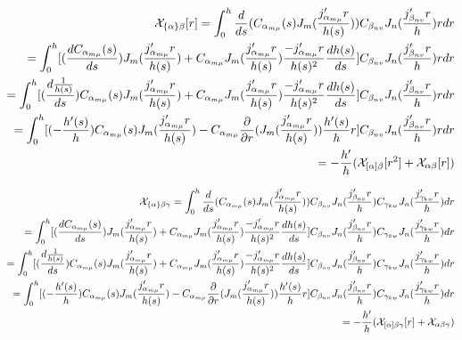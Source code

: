 \documentclass{Note}
\begin{document}
\begin{equation}
\begin{aligned}
\mathcal{X}_{\{\alpha\}\beta}[r]=\int_0^h {d\over ds}(C_{\alpha_{m\mu}}(s) J_m({j'_{\alpha_{m\mu}}r\over h(s)}))C_{\beta_{nv}} J_n({j'_{\beta_{nv}}r\over h})rdr\\
=\int_0^h [({dC_{\alpha_{m\mu}}(s)\over ds})J_m({j'_{\alpha_{m\mu}}r\over h(s)})+
C_{\alpha_{m\mu}} J_m({j'_{\alpha_{m\mu}}r\over h(s)}) {-j'_{\alpha_{m\mu}}r\over h(s)^2}{dh(s)\over ds}]C_{\beta_{nv}} J_n({j'_{\beta_{nv}}r\over h})rdr\\
=\int_0^h [({d{1\over h(s)}\over ds}){C_{\alpha_{m\mu}}(s)} J_m({j'_{\alpha_{m\mu}}r\over h(s)})+
C_{\alpha_{m\mu}} J_m({j'_{\alpha_{m\mu}}r\over h(s)}) {-j'_{\alpha_{m\mu}}r\over h(s)^2}{dh(s)\over ds}]C_{\beta_{nv}} J_n({j'_{\beta_{nv}}r\over h})rdr\\
=\int_0^h [(-{h'(s)\over h}){C_{\alpha_{m\mu}}(s) } J_m({j'_{\alpha_{m\mu}}r\over h(s)})-
C_{\alpha_{m\mu}} {\partial \over \partial r}(J_m({j'_{\alpha_{m\mu}}r\over h(s)})) {h'(s)\over h}r]C_{\beta_{nv}} J_n({j'_{\beta_{nv}}r\over h})rdr\\
=-{h'\over h}(\mathcal{X}_{[\alpha]\beta}[r^2]+\mathcal{X}_{\alpha\beta}[r])
\end{aligned}
\end{equation}


\begin{equation}
\begin{aligned}
\mathcal{X}_{\{\alpha\}\beta\gamma}=\int_0^h {d\over ds}(C_{\alpha_{m\mu}}(s) J_m({j'_{\alpha_{m\mu}}r\over h(s)}))C_{\beta_{nv}} J_n({j'_{\beta_{nv}}r\over h})C_{\gamma_{kw}} J_n({j'_{\gamma_{kw}}r\over h})dr\\
=\int_0^h [({dC_{\alpha_{m\mu}}(s)\over ds})J_m({j'_{\alpha_{m\mu}}r\over h(s)})+
C_{\alpha_{m\mu}} J_m({j'_{\alpha_{m\mu}}r\over h(s)}) {-j'_{\alpha_{m\mu}}r\over h(s)^2}{dh(s)\over ds}]C_{\beta_{nv}} J_n({j'_{\beta_{nv}}r\over h})C_{\gamma_{kw}} J_n({j'_{\gamma_{kw}}r\over h})dr\\
=\int_0^h [({d{1\over h(s)}\over ds}){C_{\alpha_{m\mu}}(s)} J_m({j'_{\alpha_{m\mu}}r\over h(s)})+
C_{\alpha_{m\mu}} J_m({j'_{\alpha_{m\mu}}r\over h(s)}) {-j'_{\alpha_{m\mu}}r\over h(s)^2}{dh(s)\over ds}]C_{\beta_{nv}} J_n({j'_{\beta_{nv}}r\over h})C_{\gamma_{kw}} J_n({j'_{\gamma_{kw}}r\over h})dr\\
=\int_0^h [(-{h'(s)\over h}){C_{\alpha_{m\mu}}(s) } J_m({j'_{\alpha_{m\mu}}r\over h(s)})-
C_{\alpha_{m\mu}} {\partial \over \partial r}(J_m({j'_{\alpha_{m\mu}}r\over h(s)})) {h'(s)\over h}r]C_{\beta_{nv}} J_n({j'_{\beta_{nv}}r\over h})C_{\gamma_{kw}} J_n({j'_{\gamma_{kw}}r\over h})dr\\
=-{h'\over h}(\mathcal{X}_{[\alpha]\beta\gamma}[r]+\mathcal{X}_{\alpha\beta\gamma})
\end{aligned}
\end{equation}
\end{document}
